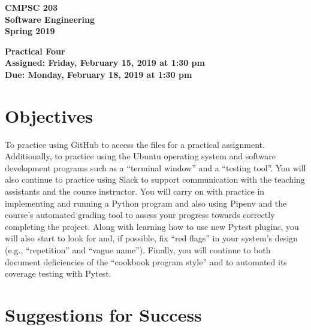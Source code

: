 \documentclass[11pt]{article}
\newcommand{\assignmentduedate}{February 18}
\newcommand{\assignmentassignedate}{February 15}
\newcommand{\assignmentnumber}{Four}
\newcommand{\labyear}{2019}
\newcommand{\labdueday}{Monday}
\newcommand{\labassignday}{Friday}
\newcommand{\labtime}{1:30 pm}
\newcommand{\assigneddate}{Assigned: \labassignday, \assignmentassignedate, \labyear{} at \labtime{}}
\newcommand{\duedate}{Due: \labdueday, \assignmentduedate, \labyear{} at \labtime{}}
\newcommand{\labtitle}[1]
{
  \begin{center}
    \begin{center}
      \bf
      CMPSC 203\\Software Engineering\\
      Spring 2019\\
      \medskip
    \end{center}
    \bf
    #1
  \end{center}
}
\begin{document}
\thispagestyle{empty}

\labtitle{Practical \assignmentnumber{} \\ \assigneddate{} \\ \duedate{}}

\section*{Objectives}

To practice using GitHub to access the files for a practical assignment.
Additionally, to practice using the Ubuntu operating system and software
development programs such as a ``terminal window'' and a ``testing tool''. You
will also continue to practice using Slack to support communication with the
teaching assistants and the course instructor. You will carry on with practice
in implementing and running a Python program and also using Pipenv and the
course's automated grading tool to assess your progress towards correctly
completing the project. Along with learning how to use new Pytest plugins, you
will also start to look for and, if possible, fix ``red flags'' in your
system's design (e.g., ``repetition'' and ``vague name''). Finally, you will
continue to both document deficiencies of the ``cookbook program style'' and to
automated its coverage testing with Pytest.

\section*{Suggestions for Success}
\end{document}
